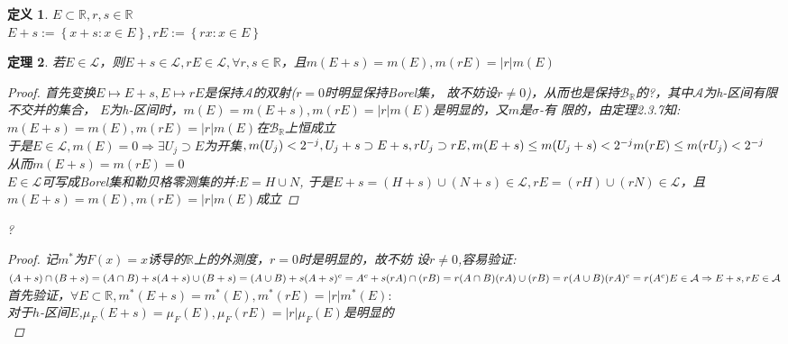 \documentclass[12pt, a4paper, oneside]{ctexbook}
\newtheorem{theorem}{定理}[section]
\newtheorem{definition}[theorem]{定义}
\begin{document}
\begin{definition}
    $E\subset\mathbb{R},r,s\in\mathbb{R}$\\
    $E+s:=\left\{x+s:x\in E\right\},rE:=\left\{rx:x\in E\right\}$
\end{definition}
\begin{theorem}
    若$E\in\mathcal{L}$，则$E+s\in\mathcal{L},rE\in\mathcal{L},\forall r,s\in\mathbb{R}$，且$m(E+s)=
    m(E),m(rE)=|r|m(E)$
    \begin{proof}
        首先变换$E\mapsto E+s,E\mapsto rE$是保持$\mathcal{A}$的双射($r=0$时明显保持Borel集，
        故不妨设$r\neq 0$)，从而也是保持$\mathcal{B}_{\mathbb{R}}$的?，其中$\mathcal{A}$为h-区间有限不交并的集合，
        $E$为h-区间时，$m(E)= m(E+s),m(rE)=|r|m(E)$是明显的，又$m$是$\sigma$-有
        限的，由定理2.3.7知:\\
        $m(E+s)=m(E),m(rE)=|r|m(E)$在$\mathcal{B}_{\mathbb{R}}$上恒成立\\
        于是$E\in\mathcal{L},m(E)=0\Rightarrow \exists U_j\supset E$为开集$,m(U_j)<2^{-j},\\
        U_j+s\supset E+s,rU_j\supset rE,\\
        m(E+s)\leq m(U_j+s)<2^{-j}\\
        m(rE)\leq m(rU_j)<2^{-j}$\\
        从而$m(E+s)=m(rE)=0$\\
        $E\in\mathcal{L}$可写成Borel集和勒贝格零测集的并:$E=H\cup N$,
        于是$E+s=(H+s)\cup(N+s)\in\mathcal{L},rE=(rH)\cup(rN)\in\mathcal{L}$，且$m(E+s)=m(E),m(rE)=|r|m(E)$成立
    \end{proof}?
    \begin{proof}
        记$m^*$为$F(x)=x$诱导的$\mathbb{R}$上的外测度，$r=0$时是明显的，故不妨
        设$r\neq 0$,容易验证:\\
        $(A+s)\cap(B+s)=(A\cap B)+s\\
        (A+s)\cup(B+s)=(A\cup B)+s\\
        (A+s)^c=A^c+s\\
        (rA)\cap(rB)=r(A\cap B)\\
        (rA)\cup(rB)=r(A\cup B)\\
        (rA)^c=r(A^c)\\
        E\in\mathcal{A}\Rightarrow E+s,rE\in\mathcal{A}$\\
        首先验证，$\forall E\subset\mathbb{R},m^*(E+s)=m^*(E),m^*(rE)=|r|m^*(E):$\\
        对于$h$-区间$E$,$\mu_F(E+s)=\mu_F(E),\mu_F(rE)=|r|\mu_F(E)$是明显的\\

\end{proof}
\end{theorem}
\end{document}
